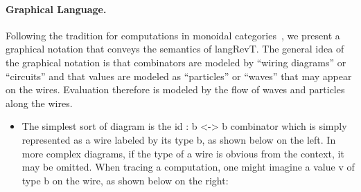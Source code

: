 \documentclass{llncs}
\begin{document}
\paragraph*{Graphical Language.}
Following the tradition for computations in monoidal
categories~\cite{springerlink:10.1007/978-3-642-12821-94}, we present a
graphical notation that conveys the semantics of {{langRevT}}.  The general
idea of the graphical notation is that combinators are modeled by ``wiring
diagrams'' or ``circuits'' and that values are modeled as ``particles'' or
``waves'' that may appear on the wires. Evaluation therefore is modeled by
the flow of waves and particles along the wires.

\begin{itemize}
\item The simplest sort of diagram is the {{id : b <-> b}} combinator which
  is simply represented as a wire labeled by its type {{b}}, as shown below
  on the left. In more complex diagrams, if the type of a wire is obvious
  from the context, it may be omitted. When tracing a computation, one might
  imagine a value {{v}} of type {{b}} on the wire, as shown below on the
  right:

  \begin{multicols}{2}
\begin{center}
\end{center}
\begin{center}
\end{center}
  \end{multicols}


\end{itemize}
\end{document}
